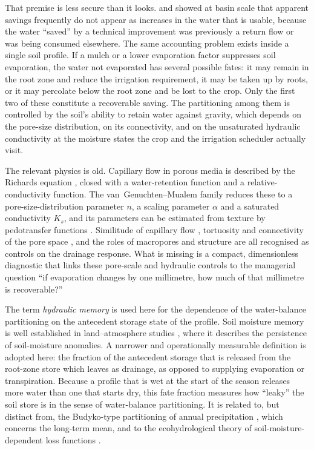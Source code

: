 \documentclass[preprint,12pt,authoryear]{elsarticle}
\begin{document}
That premise is less secure than it looks. \citet{Ward2008} and \citet{Grafton2018} showed at basin scale that apparent savings frequently do not appear as increases in the water that is usable, because the water ``saved'' by a technical improvement was previously a return flow or was being consumed elsewhere. The same accounting problem exists inside a single soil profile. If a mulch or a lower evaporation factor suppresses soil evaporation, the water not evaporated has several possible fates: it may remain in the root zone and reduce the irrigation requirement, it may be taken up by roots, or it may percolate below the root zone and be lost to the crop. Only the first two of these constitute a recoverable saving. The partitioning among them is controlled by the soil's ability to retain water against gravity, which depends on the pore-size distribution, on its connectivity, and on the unsaturated hydraulic conductivity at the moisture states the crop and the irrigation scheduler actually visit.

The relevant physics is old. Capillary flow in porous media is described by the Richards equation \citep{Richards1931}, closed with a water-retention function and a relative-conductivity function. The van~Genuchten--Mualem family \citep{vanGenuchten1980,Mualem1976} reduces these to a pore-size-distribution parameter $n$, a scaling parameter $\alpha$ and a saturated conductivity $K_s$, and its parameters can be estimated from texture by pedotransfer functions \citep{Schaap2001,Saxton2006,Weber2024}. Similitude of capillary flow \citep{Miller1956}, tortuosity and connectivity of the pore space \citep{Ghanbarian2013,Blunt2017}, and the roles of macropores and structure \citep{Beven1982,Beven2013,Jarvis2007,Strudley2008,Fatichi2020} are all recognised as controls on the drainage response. What is missing is a compact, dimensionless diagnostic that links these pore-scale and hydraulic controls to the managerial question ``if evaporation changes by one millimetre, how much of that millimetre is recoverable?''

The term \emph{hydraulic memory} is used here for the dependence of the water-balance partitioning on the antecedent storage state of the profile. Soil moisture memory is well established in land--atmosphere studies \citep{Koster2001,Koster2004,Entekhabi1996}, where it describes the persistence of soil-moisture anomalies. A narrower and operationally measurable definition is adopted here: the fraction of the antecedent storage that is released from the root-zone store which leaves as drainage, as opposed to supplying evaporation or transpiration. Because a profile that is wet at the start of the season releases more water than one that starts dry, this fate fraction measures how ``leaky'' the soil store is in the sense of water-balance partitioning. It is related to, but distinct from, the Budyko-type partitioning of annual precipitation \citep{Budyko1974,Milly1994,Zhang2001}, which concerns the long-term mean, and to the ecohydrological theory of soil-moisture-dependent loss functions \citep{Rodriguez2004}.
\end{document}
